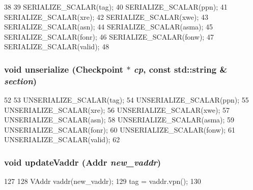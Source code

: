 \begin{DoxyCode}
38 {
39     SERIALIZE_SCALAR(tag);
40     SERIALIZE_SCALAR(ppn);
41     SERIALIZE_SCALAR(xre);
42     SERIALIZE_SCALAR(xwe);
43     SERIALIZE_SCALAR(asn);
44     SERIALIZE_SCALAR(asma);
45     SERIALIZE_SCALAR(fonr);
46     SERIALIZE_SCALAR(fonw);
47     SERIALIZE_SCALAR(valid);
48 }
\end{DoxyCode}
\hypertarget{structAlphaISA_1_1TlbEntry_af22e5d6d660b97db37003ac61ac4ee49}{
\subsubsection[{unserialize}]{\setlength{\rightskip}{0pt plus 5cm}void unserialize ({\bf Checkpoint} $\ast$ {\em cp}, \/  const std::string \& {\em section})}}
\label{structAlphaISA_1_1TlbEntry_af22e5d6d660b97db37003ac61ac4ee49}



\begin{DoxyCode}
52 {
53     UNSERIALIZE_SCALAR(tag);
54     UNSERIALIZE_SCALAR(ppn);
55     UNSERIALIZE_SCALAR(xre);
56     UNSERIALIZE_SCALAR(xwe);
57     UNSERIALIZE_SCALAR(asn);
58     UNSERIALIZE_SCALAR(asma);
59     UNSERIALIZE_SCALAR(fonr);
60     UNSERIALIZE_SCALAR(fonw);
61     UNSERIALIZE_SCALAR(valid);
62 }
\end{DoxyCode}
\hypertarget{structAlphaISA_1_1TlbEntry_a5b72666b92ee0adbe9a7d218a0343754}{
\subsubsection[{updateVaddr}]{\setlength{\rightskip}{0pt plus 5cm}void updateVaddr ({\bf Addr} {\em new\_\-vaddr})}}
\label{structAlphaISA_1_1TlbEntry_a5b72666b92ee0adbe9a7d218a0343754}



\begin{DoxyCode}
127     {
128         VAddr vaddr(new_vaddr);
129         tag = vaddr.vpn();
130     }
\end{DoxyCode}


